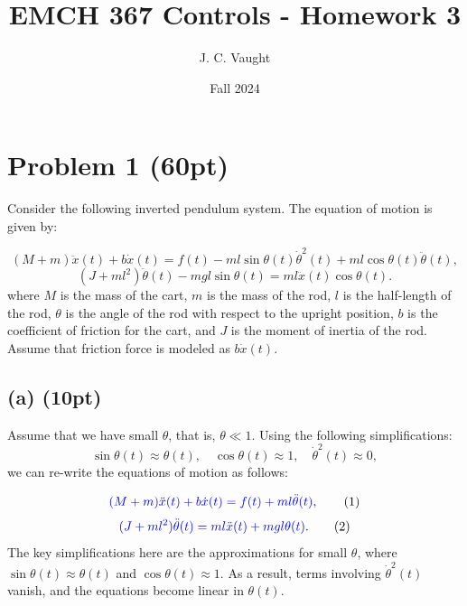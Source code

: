 \documentclass{article}
\title{EMCH 367 Controls - Homework 3}
\author{J. C. Vaught}
\date{Fall 2024}
\begin{document}
\maketitle

\section*{Problem 1 (60pt)}

Consider the following inverted pendulum system. The equation of motion is given by:

\begin{equation*}
(M + m) \ddot{x}(t) + b \dot{x}(t) = f(t) - ml \sin \theta(t) \dot{\theta}^2(t) + ml \cos \theta(t) \ddot{\theta}(t), \tag{1}
\end{equation*}
\begin{equation*}
(J + ml^2)\ddot{\theta}(t) - mgl \sin \theta(t) = ml \ddot{x}(t) \cos \theta(t). \tag{2}
\end{equation*}
\noindent
where \( M \) is the mass of the cart, \( m \) is the mass of the rod, \( l \) is the half-length of the rod, \( \theta \) is the angle of the rod with respect to the upright position, \( b \) is the coefficient of friction for the cart, and \( J \) is the moment of inertia of the rod. Assume that friction force is modeled as \( b\dot{x}(t) \).

\subsection*{(a) (10pt)}

Assume that we have small \( \theta \), that is, \( \theta \ll 1 \). Using the following simplifications:
\[
\sin \theta(t) \approx \theta(t), \quad \cos \theta(t) \approx 1, \quad \dot{\theta}^2(t) \approx 0,
\]
we can re-write the equations of motion as follows:

\begin{equation*}
\textcolor{blue}{(M + m) \ddot{x}(t) + b \dot{x}(t) = f(t) + ml \ddot{\theta}(t)}, \tag{1}
\end{equation*}
\begin{equation*}
\textcolor{blue}{(J + ml^2)\ddot{\theta}(t) = ml \ddot{x}(t) + mgl \theta(t)}. \tag{2}
\end{equation*}
\noindent
The key simplifications here are the approximations for small \( \theta \), where \( \sin \theta(t) \approx \theta(t) \) and \( \cos \theta(t) \approx 1 \). As a result, terms involving \( \dot{\theta}^2(t) \) vanish, and the equations become linear in \( \theta(t) \).
\end{document}
